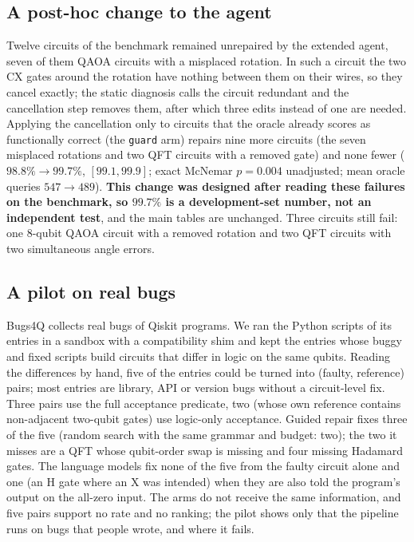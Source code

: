 \documentclass[journal]{IEEEtran}
\begin{document}
\subsection{A post-hoc change to the agent}

Twelve circuits of the benchmark remained unrepaired by the extended agent, seven of them QAOA circuits with a misplaced
rotation. In such a circuit the two CX gates around the rotation have nothing between them on their wires, so they cancel
exactly; the static diagnosis calls the circuit redundant and the cancellation step removes them, after which three edits
instead of one are needed. Applying the cancellation only to circuits that the oracle already scores as functionally correct
(the \texttt{guard} arm) repairs nine more circuits (the seven misplaced rotations and two QFT circuits with a removed gate) and none fewer ($98.8\%\rightarrow99.7\%$, $[99.1,99.9]$; exact McNemar
$p=0.004$ unadjusted; mean oracle queries $547\rightarrow489$). \textbf{This change was designed after reading these failures on
the benchmark, so $99.7\%$ is a development-set number, not an independent test}, and the main tables are unchanged. Three
circuits still fail: one 8-qubit QAOA circuit with a removed rotation and two QFT circuits with two simultaneous angle errors.

\subsection{A pilot on real bugs}

Bugs4Q collects real bugs of Qiskit programs. We ran the Python scripts of its entries in a
sandbox with a compatibility shim and kept the entries whose buggy and fixed scripts build
circuits that differ in logic on the same qubits. Reading the differences by hand, five of the
entries could be turned into (faulty, reference) pairs; most entries are library, API or version
bugs without a circuit-level fix. Three pairs use the full acceptance predicate, two (whose own
reference contains non-adjacent two-qubit gates) use logic-only acceptance. Guided repair fixes
three of the five (random search with the same grammar and budget: two); the two it misses are a
QFT whose qubit-order swap is missing and four missing Hadamard gates. The language models fix
none of the five from the faulty circuit alone and one (an H gate where an X was intended) when
they are also told the program's output on the all-zero input. The arms do not receive the same
information, and five pairs support no rate and no ranking; the pilot shows only that the pipeline
runs on bugs that people wrote, and where it fails.
\end{document}
